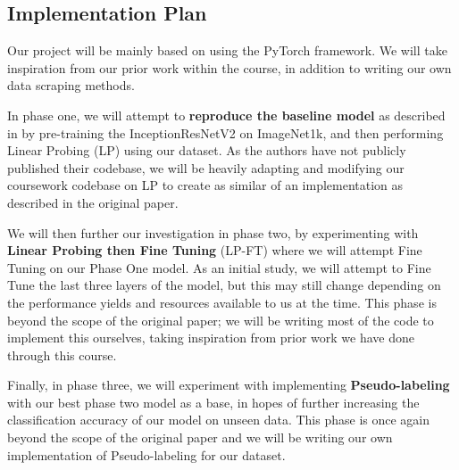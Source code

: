 \documentclass{article}
\begin{document}
\subsection{Implementation Plan}
Our project will be mainly based on using the PyTorch framework. We will take inspiration from our prior work within the course, in addition to writing our own data scraping methods.

In phase one, we will attempt to \textbf{reproduce the baseline model} as described in \citet{awangiskandar2020} by pre-training the InceptionResNetV2 on ImageNet1k, and then performing Linear Probing (LP) using our dataset. As the authors have not publicly published their codebase, we will be heavily adapting and modifying our coursework codebase on LP to create as similar of an implementation as described in the original paper.

We will then further our investigation in phase two, by experimenting with \textbf{Linear Probing then Fine Tuning} (LP-FT) where we will attempt Fine Tuning on our Phase One model. As an initial study, we will attempt to Fine Tune the last three layers of the model, but this may still change depending on the performance yields and resources available to us at the time. This phase is beyond the scope of the original paper; we will be writing most of the code to implement this ourselves, taking inspiration from prior work we have done through this course.

Finally, in phase three, we will experiment with implementing \textbf{Pseudo-labeling} with our best phase two model as a base, in hopes of further increasing the classification accuracy of our model on unseen data. This phase is once again beyond the scope of the original paper and we will be writing our own implementation of Pseudo-labeling for our dataset.
\newpage


\end{document}
